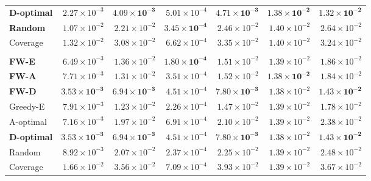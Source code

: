 \documentclass[letterpaper, 9
 pt, conference]{ieeeconf}
\begin{document}
\begin{table}[ht]
\begin{tabular}{lrrrrrr}
\textbf{D-optimal} & $2.27\!\times\!10^{-3}$ & $\mathbf{4.09\!\times\!10^{-3}}$ & $5.01\!\times\!10^{-4}$ & $\mathbf{4.71\!\times\!10^{-3}}$ & $\mathbf{1.38\!\times\!10^{-2}}$ & $\mathbf{1.32\!\times\!10^{-2}}$ \\
\textbf{Random} & $1.07\!\times\!10^{-2}$ & $2.21\!\times\!10^{-2}$ & $\mathbf{3.45\!\times\!10^{-4}}$ & $2.46\!\times\!10^{-2}$ & $1.40\!\times\!10^{-2}$ & $2.64\!\times\!10^{-2}$ \\
Coverage & $1.32\!\times\!10^{-2}$ & $3.08\!\times\!10^{-2}$ & $6.62\!\times\!10^{-4}$ & $3.35\!\times\!10^{-2}$ & $1.40\!\times\!10^{-2}$ & $3.24\!\times\!10^{-2}$ \\
\addlinespace[1pt]
\multicolumn{7}{l}{\textit{$K{=}50$}} \\[1pt]
\textbf{FW-E} & $6.49\!\times\!10^{-3}$ & $1.36\!\times\!10^{-2}$ & $\mathbf{1.80\!\times\!10^{-4}}$ & $1.51\!\times\!10^{-2}$ & $1.39\!\times\!10^{-2}$ & $1.86\!\times\!10^{-2}$ \\
\textbf{FW-A} & $7.71\!\times\!10^{-3}$ & $1.31\!\times\!10^{-2}$ & $3.51\!\times\!10^{-4}$ & $1.52\!\times\!10^{-2}$ & $\mathbf{1.38\!\times\!10^{-2}}$ & $1.84\!\times\!10^{-2}$ \\
\textbf{FW-D} & $\mathbf{3.53\!\times\!10^{-3}}$ & $\mathbf{6.94\!\times\!10^{-3}}$ & $4.51\!\times\!10^{-4}$ & $\mathbf{7.80\!\times\!10^{-3}}$ & $1.38\!\times\!10^{-2}$ & $\mathbf{1.43\!\times\!10^{-2}}$ \\
Greedy-E & $7.91\!\times\!10^{-3}$ & $1.23\!\times\!10^{-2}$ & $2.26\!\times\!10^{-4}$ & $1.47\!\times\!10^{-2}$ & $1.39\!\times\!10^{-2}$ & $1.78\!\times\!10^{-2}$ \\
A-optimal & $7.16\!\times\!10^{-3}$ & $1.97\!\times\!10^{-2}$ & $6.91\!\times\!10^{-4}$ & $2.10\!\times\!10^{-2}$ & $1.39\!\times\!10^{-2}$ & $2.38\!\times\!10^{-2}$ \\
\textbf{D-optimal} & $\mathbf{3.53\!\times\!10^{-3}}$ & $\mathbf{6.94\!\times\!10^{-3}}$ & $4.51\!\times\!10^{-4}$ & $\mathbf{7.80\!\times\!10^{-3}}$ & $1.38\!\times\!10^{-2}$ & $\mathbf{1.43\!\times\!10^{-2}}$ \\
Random & $8.92\!\times\!10^{-3}$ & $2.07\!\times\!10^{-2}$ & $2.37\!\times\!10^{-4}$ & $2.25\!\times\!10^{-2}$ & $1.39\!\times\!10^{-2}$ & $2.48\!\times\!10^{-2}$ \\
Coverage & $1.66\!\times\!10^{-2}$ & $3.56\!\times\!10^{-2}$ & $7.09\!\times\!10^{-4}$ & $3.93\!\times\!10^{-2}$ & $1.39\!\times\!10^{-2}$ & $3.67\!\times\!10^{-2}$ \\
\bottomrule
\end{tabular}
\end{table}
\end{document}
